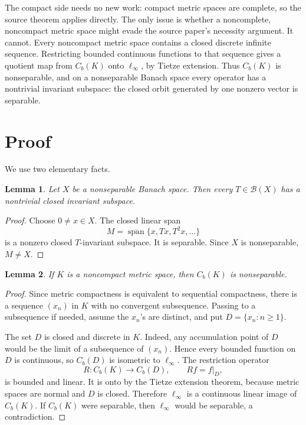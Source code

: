 \documentclass[11pt]{article}
\newtheorem{lemma}{Lemma}
\DeclareMathOperator{\spanop}{span}
\begin{document}
The compact side needs no new work: compact metric spaces are complete, so the
source theorem applies directly.  The only issue is whether a noncomplete,
noncompact metric space might evade the source paper's necessity argument.
It cannot.  Every noncompact metric space contains a closed discrete infinite
sequence.  Restricting bounded continuous functions to that sequence gives a
quotient map from \(C_b(K)\) onto \(\ell_\infty\), by Tietze extension.  Thus
\(C_b(K)\) is nonseparable, and on a nonseparable Banach space every operator
has a nontrivial invariant subspace: the closed orbit generated by one nonzero
vector is separable.

\section*{Proof}

We use two elementary facts.

\begin{lemma}\label{lem:nonsep}
Let \(X\) be a nonseparable Banach space.  Then every \(T\in\mathcal B(X)\)
has a nontrivial closed invariant subspace.
\end{lemma}

\begin{proof}
Choose \(0\neq x\in X\).  The closed linear span
\[
  M=\overline{\spanop}\{x,Tx,T^2x,\ldots\}
\]
is a nonzero closed \(T\)-invariant subspace.  It is separable.  Since \(X\) is
nonseparable, \(M\neq X\).
\end{proof}

\begin{lemma}\label{lem:cbnonsep}
If \(K\) is a noncompact metric space, then \(C_b(K)\) is nonseparable.
\end{lemma}

\begin{proof}
Since metric compactness is equivalent to sequential compactness, there is a
sequence \((x_n)\) in \(K\) with no convergent subsequence.  Passing to a
subsequence if needed, assume the \(x_n\)'s are distinct, and put
\(D=\{x_n:n\geq 1\}\).

The set \(D\) is closed and discrete in \(K\).  Indeed, any accumulation point
of \(D\) would be the limit of a subsequence of \((x_n)\).  Hence every bounded
function on \(D\) is continuous, so \(C_b(D)\) is isometric to \(\ell_\infty\).
The restriction operator
\[
  R:C_b(K)\longrightarrow C_b(D),\qquad Rf=f|_D,
\]
is bounded and linear.  It is onto by the Tietze extension theorem, because
metric spaces are normal and \(D\) is closed.  Therefore \(\ell_\infty\) is a
continuous linear image of \(C_b(K)\).  If \(C_b(K)\) were separable, then
\(\ell_\infty\) would be separable, a contradiction.
\end{proof}
\end{document}
